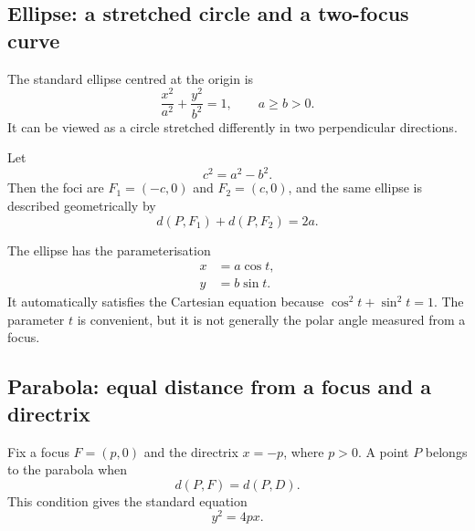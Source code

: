 \subsection{Ellipse: a stretched circle and a two-focus curve}

The standard ellipse centred at the origin is
\[
\boxed{\frac{x^2}{a^2}+\frac{y^2}{b^2}=1},
\qquad a\geq b>0.
\]
It can be viewed as a circle stretched differently in two perpendicular
directions.

\begin{center}
\end{center}

Let
\[
c^2=a^2-b^2.
\]
Then the foci are $F_1=(-c,0)$ and $F_2=(c,0)$, and the same ellipse is described
geometrically by
\[
\boxed{d(P,F_1)+d(P,F_2)=2a}.
\]

\begin{interpretationbox}
The ellipse has the parameterisation
\[
\boxed{
\begin{aligned}
x&=a\cos t,\\
y&=b\sin t.
\end{aligned}}
\]
It automatically satisfies the Cartesian equation because
$\cos^2t+\sin^2t=1$. The parameter $t$ is convenient, but it is not generally the
polar angle measured from a focus.
\end{interpretationbox}

\subsection{Parabola: equal distance from a focus and a directrix}

Fix a focus $F=(p,0)$ and the directrix $x=-p$, where $p>0$. A point $P$ belongs
to the parabola when
\[
\boxed{d(P,F)=d(P,D)}.
\]
This condition gives the standard equation
\[
\boxed{y^2=4px}.
\]

